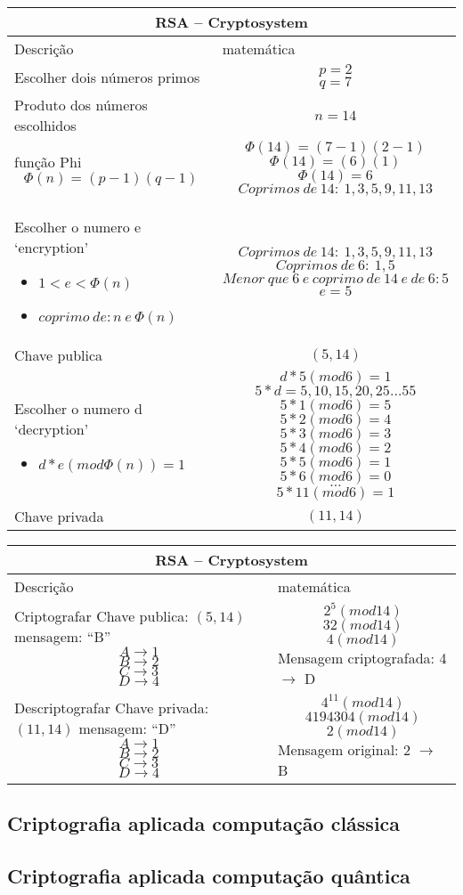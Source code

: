 \vspace{1cm}
\begin{longtable}{ |p{6cm}|| p{8cm}|  }
  \hline
  \multicolumn{2}{|c|}{RSA – Cryptosystem} \\
  \hline
    Descrição & matemática\\
  \hline
    Escolher dois números primos & 
    \[p=2\] \[q=7\]\\
  \hline
    Produto dos números escolhidos & 
    \[n=14\]\\
  \hline
    função Phi 
    \[\Phi(n)=(p-1)(q-1)\] & 
    \[\Phi(14)=(7-1)(2-1)\]
    \[\Phi(14)=(6)(1)\]
    \[\Phi(14)=6\]
    \[Coprimos\: de\: 14:\: 1, 3, 5, 9, 11, 13\]\\
  \hline
    Escolher o numero e `encryption'
    \begin{itemize}
      \item $1 < e < \Phi(n)$
      \item $coprimo\: de: n\: e\: \Phi(n)$
    \end{itemize} &
    \[Coprimos\: de\: 14:\: 1, 3, 5, 9, 11, 13\]
    \[Coprimos\: de\: 6:\: 1, 5\]
    \[Menor\: que\: 6\: e\: coprimo\: de\: 14\: e\: de\: 6: 5\]
    \[e = 5\]\\
  \hline
    Chave publica & 
    \[(5, 14)\]\\
  \hline
  Escolher o numero d `decryption'
    \begin{itemize}
      \item $d * e (mod \Phi(n)) = 1$
    \end{itemize} & 
    \[d * 5 (mod 6) = 1\]
    \[5*d = 5, 10, 15, 20, 25 \dots 55\]
    \[5*1 (mod 6) = 5\]
    \[5*2 (mod 6) = 4\]
    \[5*3 (mod 6) = 3\]
    \[5*4 (mod 6) = 2\]
    \[5*5 (mod 6) = 1\]
    \[5*6 (mod 6) = 0\]
    \[ \dots \]
    \[5*11 (mod 6) = 1\] \\
  \hline
  Chave privada & 
  \[(11, 14)\]\\
\hline
\end{longtable}

\vspace{1cm}
\begin{longtable}{ |p{6cm}|| p{8cm}|  }
  \hline
  \multicolumn{2}{|c|}{RSA – Cryptosystem} \\
  \hline
    Descrição & matemática\\
  \hline
    Criptografar \newline
    Chave publica: $(5, 14)$ \newline
    mensagem: ``B'' 
    \[A \to 1\]
    \[B \to 2\]
    \[C \to 3\]
    \[D \to 4\] & 
    \[2^5(mod 14)\]
    \[32(mod 14)\]
    \[4(mod 14)\]
    Mensagem criptografada: 4 $\to$ D\\
  \hline
    Descriptografar \newline
    Chave privada: $(11, 14)$ \newline
    mensagem: ``D'' 
    \[A \to 1\]
    \[B \to 2\]
    \[C \to 3\]
    \[D \to 4\] & 
    \[4^{11}(mod 14)\]
    \[4194304(mod 14)\]
    \[2(mod 14)\]
    Mensagem original: 2 $\to$ B\\
  \hline
\end{longtable}

\subsection{Criptografia aplicada computação clássica}
\subsection{Criptografia aplicada computação quântica}